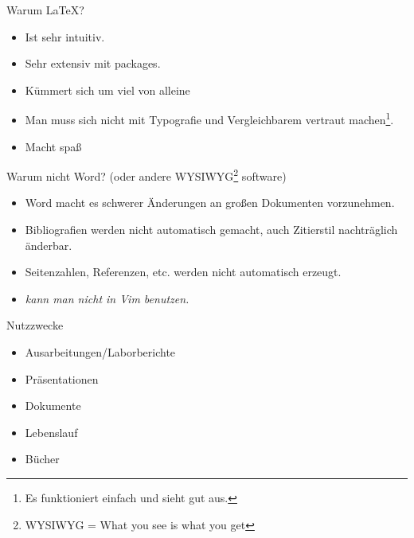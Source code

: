 \documentclass{beamer}
\begin{document}
\begin{frame}{Warum \LaTeX?}
    \begin{itemize}
        \item Ist sehr intuitiv.
        \item Sehr extensiv mit packages.
        \item K\"ummert sich um viel von alleine
        \item Man muss sich nicht mit Typografie und Vergleichbarem vertraut machen\footnote{Es funktioniert einfach und sieht gut aus.}.
        \item Macht spa\ss
    \end{itemize}
\end{frame}



\begin{frame}{Warum nicht Word? (oder andere WYSIWYG\footnote{WYSIWYG = What you see is what you get} software)}
    \begin{itemize}
        \item Word macht es schwerer \"Anderungen an gro\ss{}en Dokumenten vorzunehmen.
        \item Bibliografien werden nicht automatisch gemacht, auch Zitierstil nachtr\"aglich \"anderbar.
        \item Seitenzahlen, Referenzen, etc. werden nicht automatisch erzeugt.
        \item \textit{kann man nicht in Vim benutzen.}
    \end{itemize}
    
\end{frame}




\begin{frame}{Nutzzwecke}

    \begin{itemize}
        \item Ausarbeitungen/Laborberichte
        \item Pr\"asentationen
        \item Dokumente
        \item Lebenslauf
        \item B\"ucher
    \end{itemize}
\end{frame}
\end{document}
